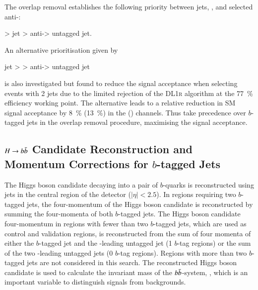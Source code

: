The overlap removal establishes the following priority between jets,
\tauhadvis, and selected anti-\tauhadvis:
\begin{center}
  \tauhadvis > \btagged jet > anti-\tauhadvis > untagged jet.
\end{center}
An alternative prioritisation given by
\begin{center}
  \btagged jet > \tauhadvis > anti-\tauhadvis > untagged jet
\end{center}
is also investigated but found to reduce the signal acceptance when
selecting events with 2 \btagged jets due to the limited \tauhadvis
rejection of the \textsc{DL1r} \btag algorithm at the
\SI{77}{\percent} efficiency working point. The alternative leads to a
relative reduction in SM \HH signal acceptance by \SI{8}{\percent}
(\SI{13}{\percent}) in the \lephad (\hadhad) channels. Thus \tauhadvis
take precedence over $b$-tagged jets in the overlap removal procedure,
maximising the signal acceptance.



\subsection{$H \to b\bar{b}$ Candidate Reconstruction and Momentum
  Corrections for $b$-tagged Jets}%
\label{sec:hbb_reco}%
\label{sec:bjet_momentum_corrections}


The Higgs boson candidate decaying into a pair of $b$-quarks is
reconstructed using jets in the central region of the detector
($|\eta| < 2.5$). In regions requiring two $b$-tagged jets, the
four-momentum of the Higgs boson candidate is reconstructed by summing
the four-momenta of both $b$-tagged jets. The Higgs boson candidate
four-momentum in regions with fewer than two $b$-tagged jets, which
are used as control and validation regions, is reconstructed from the
sum of four momenta of either the $b$-tagged jet and the \pT-leading
untagged jet (1 $b$-tag regions) or the sum of the two \pT-leading
untagged jets (0 $b$-tag regions). Regions with more than two
$b$-tagged jets are not considered in this search. The reconstructed
Higgs boson candidate is used to calculate the invariant mass of the
$b\bar{b}$-system, \mBB, which is an important variable to distinguish
signals from backgrounds.

